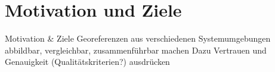 \section{Motivation und Ziele}
Motivation \& Ziele
  Georeferenzen aus verschiedenen Systemumgebungen abbildbar, vergleichbar, zusammenführbar machen
  Dazu Vertrauen und Genauigkeit (Qualitätskriterien?) ausdrücken